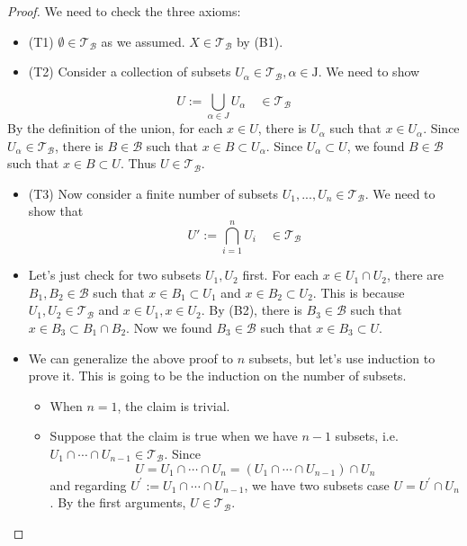 \documentclass[
]{book}
\providecommand{\tightlist}{%
  \setlength{\itemsep}{0pt}\setlength{\parskip}{0pt}}
\theoremstyle{definition}
\theoremstyle{definition}
\theoremstyle{definition}
\theoremstyle{definition}
\theoremstyle{remark}
\begin{document}
\begin{proof}

We need to check the three axioms:

\begin{itemize}
\item
  (T1) \(\emptyset \in \mathcal{T}_{\mathcal{B}}\) as we assumed. \(X \in \mathcal{T}_{\mathcal{B}}\) by (B1).
\item
  (T2) Consider a collection of subsets \(U_{\alpha} \in \mathcal{T}_{\mathcal{B}}, \alpha \in \mathrm{J}\). We need to show
\end{itemize}

\[
U:=\bigcup_{\alpha \in J} U_{\alpha} \quad \in \mathcal{T}_{\mathcal{B}}
\]
By the definition of the union, for each \(x \in U\), there is \(U_{\alpha}\) such that \(x \in U_{\alpha}\). Since \(U_{\alpha} \in \mathcal{T}_{\mathcal{B}}\), there is \(B \in \mathcal{B}\) such that \(x \in B \subset U_{\alpha}\). Since \(U_{\alpha} \subset U\), we found \(B \in \mathcal{B}\) such that \(x \in B \subset U\). Thus \(U \in \mathcal{T}_{\mathcal{B}}\).

\begin{itemize}
\item
  (T3) Now consider a finite number of subsets \(U_{1},..., U_{n} \in \mathcal{T}_{\mathcal{B}}\). We need to show that
  \[
  U':=\bigcap_{i=1}^{n} U_{i} \quad \in \mathcal{T}_{\mathcal{B}}
  \]
\item
  Let's just check for two subsets \(U_{1}, U_{2}\) first. For each \(x \in U_{1} \cap U_{2}\), there are \(B_{1}, B_{2} \in \mathcal{B}\) such that \(x \in B_{1} \subset U_{1}\) and \(x \in B_{2} \subset U_{2}\). This is because \(U_{1}, U_{2} \in \mathcal{T}_{\mathcal{B}}\) and \(x \in U_{1}, x \in U_{2}\). By (B2), there is \(B_{3} \in \mathcal{B}\) such that \(x \in B_{3} \subset B_{1} \cap B_{2}\). Now we found \(B_{3} \in \mathcal{B}\) such that \(x \in B_{3} \subset U\).
\item
  We can generalize the above proof to \(n\) subsets, but let's use induction to prove it. This is going to be the induction on the number of subsets.

  \begin{itemize}
  \tightlist
  \item
    When \(n=1\), the claim is trivial.
  \item
    Suppose that the claim is true when we have \(n-1\) subsets, i.e.~\(U_{1} \cap \cdots \cap U_{n-1} \in \mathcal{T}_{\mathcal{B}}\). Since \[
    U=U_{1} \cap \cdots \cap U_{n}=\left(U_{1} \cap \cdots \cap U_{n-1}\right) \cap U_{n}
    \]
    and regarding \(U^{\prime}:=U_{1} \cap \cdots \cap U_{n-1}\), we have two subsets case \(U=U^{\prime} \cap U_{n}\). By the first arguments, \(U \in \mathcal{T}_{\mathcal{B}}\).
  \end{itemize}
\end{itemize}

\end{proof}
\end{document}
